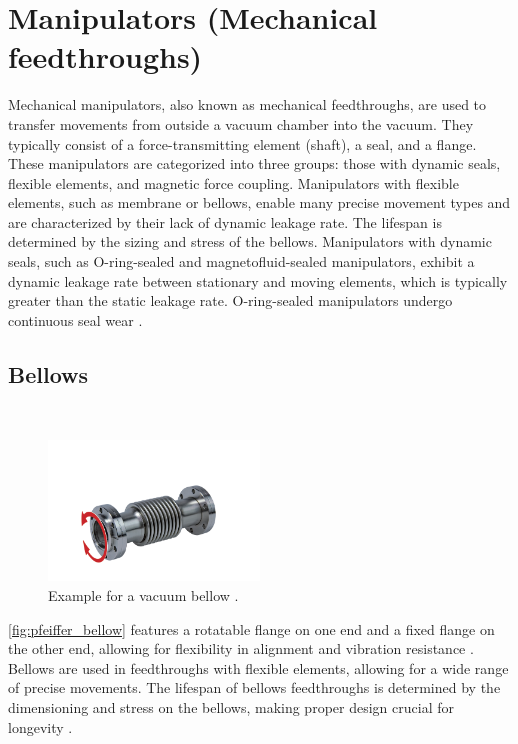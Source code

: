 \section{Manipulators (Mechanical feedthroughs)}


Mechanical manipulators, also known as mechanical feedthroughs, are used to transfer movements from outside a vacuum chamber into the vacuum.
They typically consist of a force-transmitting element (shaft), a seal, and a flange. These manipulators are categorized into three groups: those with dynamic seals, flexible elements, and magnetic force coupling.
Manipulators with flexible elements, such as membrane or bellows, enable many precise movement types and are characterized by their lack of dynamic leakage rate. The lifespan is determined by the sizing and stress of the bellows.
Manipulators with dynamic seals, such as O-ring-sealed and magnetofluid-sealed manipulators, exhibit a dynamic leakage rate between stationary and moving elements, which is typically greater than the static leakage rate. O-ring-sealed manipulators undergo continuous seal wear \cite{jousten_handbuch_2018}.




\subsection{Bellows}
\
\begin{figure}[H]
    \centering
    \includegraphics[width=0.5\textwidth]{sections/imges/ports/bellows.png}
    \caption{Example for a vacuum bellow \cite{pfeiffer_bellows}.}
    \label{fig:pfeiffer_bellow}
\end{figure}

\autoref{fig:pfeiffer_bellow} features a rotatable flange on one end and a fixed flange on the other end, allowing for flexibility in alignment and vibration resistance \cite{pfeiffer_bellows}.
Bellows are used in feedthroughs with flexible elements, allowing for a wide range of precise movements.
The lifespan of bellows feedthroughs is determined by the dimensioning and stress on the bellows, making proper design crucial for longevity \cite{jousten_handbuch_2018}.

